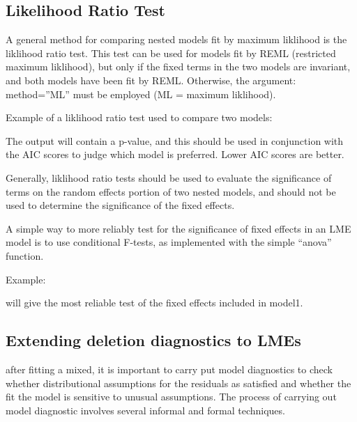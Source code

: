\documentclass[12pt, a4paper]{report}
\theoremstyle{plain}
\theoremstyle{definition}
\theoremstyle{remark}
\begin{document}
\subsection{Likelihood Ratio Test}
A general method for comparing nested models fit by maximum liklihood is the liklihood ratio 
test. This test can be used for models fit by REML (restricted maximum liklihood), but only if the 
fixed terms in the two models are invariant, and both models have been fit by REML. Otherwise, 
the argument: method=”ML” must be employed (ML = maximum liklihood). 

Example of a liklihood ratio test used to compare two models: 



The output will contain a p-value, and this should be used in conjunction with the AIC scores to 
judge which model is preferred. Lower AIC scores are better. 

Generally, liklihood ratio tests should be used to evaluate the significance of terms on the 
random effects portion of two nested models, and should not be used to determine the 
significance of the fixed effects. 

A simple way to more reliably test for the significance of fixed effects in an LME model is to use 
conditional F-tests, as implemented with the simple “anova” function. 

Example: 

will give the most reliable test of the fixed effects included in model1. 







\subsection{Extending deletion diagnostics to LMEs}
after fitting a mixed, it is important to carry put model diagnostics to check whether distributional assumptions for the
residuals as satisfied and whether the fit the model is sensitive to unusual assumptions. The process of carrying out model
diagnostic involves several informal and formal techniques.

\end{document}
